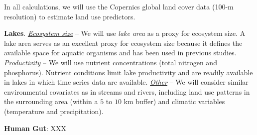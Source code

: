 \documentclass[12pt, class=article, crop=false]{standalone}
\begin{document}
In all calculations, we will use the Copernics global land cover data (100-m resolution) to estimate land use predictors.

\textbf{Lakes}.
\ul{\textit{Ecosystem size}} --
We will use \textit{lake area} as a proxy for ecosystem size.
A lake area serves as an excellent proxy for ecosystem size because it defines the available space for aquatic organisms and has been used in previous studies.
\ul{\textit{Productivity}} -- 
We will use nutrient concentrations (total nitrogen and phosphorus).  
Nutrient conditions limit lake productivity and are readily available in lakes in which time series data are available.
\ul{\textit{Other}} -- We will consider similar environmental covariates as in streams and rivers, including land use patterns in the surrounding area (within a $5$ to $10$ km buffer) and climatic variables (temperature and precipitation).

\textbf{Human Gut}: XXX
\end{document}
